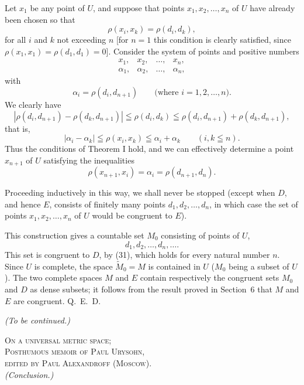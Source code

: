 \documentclass[a4paper,12pt]{amsart}
\newcommand{\srcpage}[1]{} %
\begin{document}
Let $x_1$ be any point of $U$, and suppose that points $x_1,x_2,\dots,x_n$ of $U$ have already been chosen so that
\begin{equation}\tag{30}
\rho(x_i,x_k)=\rho(d_i,d_k),
\end{equation}
for all $i$ and $k$ not exceeding $n$ [for $n=1$ this condition is clearly satisfied, since $\rho(x_1,x_1)=\rho(d_1,d_1)=0$]. Consider the system of points and positive numbers
\[
\begin{array}{cccc}
x_1,&x_2,&\dots,&x_n,\\
\alpha_1,&\alpha_2,&\dots,&\alpha_n,
\end{array}
\]
with
\[
\alpha_i=\rho(d_i,d_{n+1})\qquad\text{(where $i=1,2,\dots,n$).}
\]
We clearly have
\[
|\rho(d_i,d_{n+1})-\rho(d_k,d_{n+1})|\leqq\rho(d_i,d_k)
\leqq\rho(d_i,d_{n+1})+\rho(d_k,d_{n+1}),
\]
that is,
\[
|\alpha_i-\alpha_k|\leqq\rho(x_i,x_k)\leqq\alpha_i+\alpha_k\qquad(i,k\leqq n).
\]
Thus the conditions of Theorem I hold, and we can effectively determine a point $x_{n+1}$ of $U$ satisfying the inequalities
\begin{equation}\tag{31}
\rho(x_{n+1},x_i)=\alpha_i=\rho(d_{n+1},d_n).
\end{equation}
\srcpage{64}
Proceeding inductively in this way, we shall never be stopped (except when $D$, and hence $E$, consists of finitely many points $d_1,d_2,\dots,d_n$, in which case the set of points $x_1,x_2,\dots,x_n$ of $U$ would be congruent to $E$).

This construction gives a countable set $M_0$ consisting of points of $U$,
\begin{equation}\tag{32}
d_1,d_2,\dots,d_n,\dots.
\end{equation}
This set is congruent to $D$, by (31), which holds for every natural number $n$. Since $U$ is complete, the space $\widetilde{M}_0=M$ is contained in $U$ ($M_0$ being a subset of $U$). The two complete spaces $M$ and $E$ contain respectively the congruent sets $M_0$ and $D$ as dense subsets; it follows from the result proved in Section~6 that $M$ and $E$ are congruent.
\hfill \mbox{Q. E. D.}

\begin{flushright}\textit{(To be continued.)}\end{flushright}
\srcpage{74}
\begin{center}
\textsc{On a universal metric space;}\\
\textsc{Posthumous memoir of Paul Urysohn,}\\
\textsc{edited by Paul Alexandroff (Moscow).}\\
\textit{(Conclusion.)}
\end{center}
\end{document}
